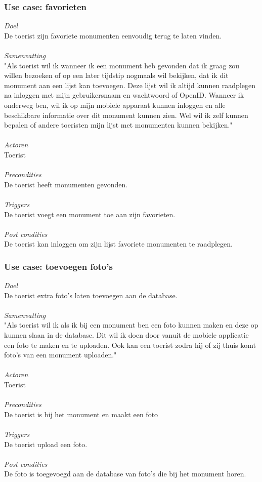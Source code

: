 \documentclass[a4paper,10pt]{article}
\begin{document}
			\subsubsection{Use case: favorieten}
			\textit{Doel}\\
			De toerist zijn favoriete monumenten eenvoudig terug te laten vinden.\\ \\
			\textit{Samenvatting}\\
			"Als toerist wil ik wanneer ik een monument heb gevonden dat ik graag zou willen bezoeken of op een later tijdstip nogmaals wil bekijken, dat ik dit monument aan een lijst kan toevoegen. Deze lijst wil ik altijd kunnen raadplegen na inloggen met mijn gebruikersnaam en wachtwoord of OpenID. Wanneer ik onderweg ben, wil ik op mijn mobiele apparaat kunnen inloggen en alle beschikbare informatie over dit monument kunnen zien. Wel wil ik zelf kunnen bepalen of andere toeristen mijn lijst met monumenten kunnen bekijken."\\ \\
			\textit{Actoren}\\
			Toerist\\ \\
			\textit{Precondities}\\
			De toerist heeft monumenten gevonden.\\ \\
			\textit{Triggers}\\
			De toerist voegt een monument toe aan zijn favorieten.\\ \\
			\textit{Post condities}\\
			De toerist kan inloggen om zijn lijst favoriete monumenten te raadplegen.	
			
			\subsubsection{Use case: toevoegen foto's}
			\textit{Doel}\\
			De toerist extra foto's laten toevoegen aan de database.\\ \\
			\textit{Samenvatting}\\
			"Als toerist wil ik als ik bij een monument ben een foto kunnen maken en deze op kunnen slaan in de database. Dit wil ik doen door vanuit de mobiele applicatie een foto te maken en te uploaden. Ook kan een toerist zodra hij of zij thuis komt foto's van een monument uploaden."\\ \\
			\textit{Actoren}\\
			Toerist\\ \\
			\textit{Precondities}\\
			De toerist is bij het monument en maakt een foto\\ \\
			\textit{Triggers}\\
			De toerist upload een foto.\\ \\
			\textit{Post condities}\\
			De foto is toegevoegd aan de database van foto's die bij het monument horen.
\end{document}
